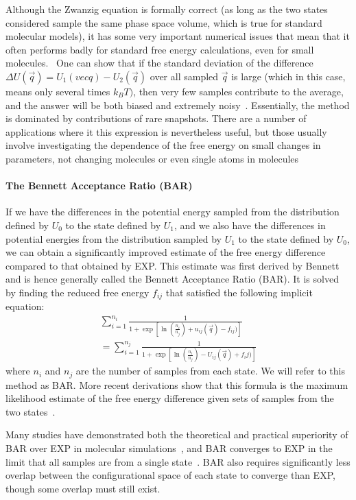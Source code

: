\documentclass[9pt,bestpractices]{livecoms}
\begin{document}
Although the Zwanzig equation is formally correct (as long as the two states considered sample the same phase space volume, which is true for standard molecular models), it has some very important numerical issues that mean that it often performs badly for standard free energy calculations, even for small molecules.~\cite{shirts2005comparison,lu2003appropriate}  One can show that if the standard deviation of the difference $\Delta U(\vec{q}) = U_1(vec{q})-U_2(\vec{q})$ over all sampled $\vec{q}$ is large (which in this case, means only several times $k_BT)$, then very few samples contribute to the average, and the answer will be both biased and extremely noisy~\cite{xx}. Essentially, the method is dominated by contributions of rare snapshots\cite{Jarzynski:PRE:2006,Wu:JCP:2005a,Wu:JCP:2005b}. There are a number of applications where it this expression is nevertheless useful, but those usually involve investigating the dependence of the free energy on small changes in parameters, not changing molecules or even single atoms in molecules~\cite{xx}

\paragraph{The Bennett Acceptance Ratio (BAR)}

If we have the differences in the potential energy sampled from the distribution defined by $U_0$ to the state defined by $U_1$, and we also have the differences in potential energies from the distribution sampled by $U_1$ to the state defined by $U_0$, we can obtain a significantly improved estimate of the
free energy difference compared to that obtained by EXP.  
This estimate was first derived by Bennett and is hence generally called the Bennett Acceptance Ratio (BAR).  It is solved by finding the reduced free energy $f_{ij}$ that satisfied the following implicit equation:
\begin{eqnarray}
 \sum_{i=1}^{n_i} \frac{1}{1 + \exp[\ln(\frac{n_i}{n_j}) + u_{ij}(\vec{q}) - f_{ij})
 ]} \nonumber \\
 =\sum_{i=1}^{n_j} \frac{1}{1 + \exp[\ln(\frac{n_i}{n_j}) - U_{ij}(\vec{q}) + f_ij)]}
\end{eqnarray}
where $n_i$ and $n_j$ are the number of samples from each state. We
will refer to this method as BAR. More recent derivations show that this formula is the maximum likelihood estimate of the free energy difference
given sets of samples from the two states~\cite{shirts.bennett}. 

Many studies have demonstrated both the
theoretical and practical superiority of BAR over EXP in molecular
simulations~\cite{shirts2005comparison,lu2003appropriate}, and BAR converges to EXP in the limit that all samples are from a
single state~\cite{bennett1976efficient,shirts.bennett}. BAR also requires significantly less
overlap between the configurational space of each state to converge than EXP, though some overlap must still exist.
\end{document}
